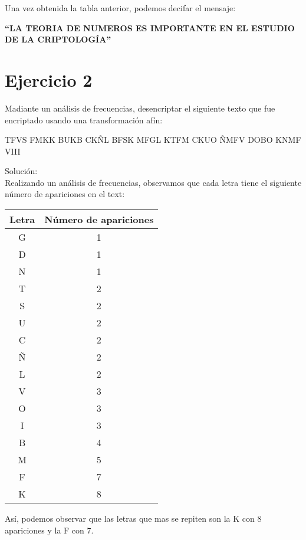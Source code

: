 \documentclass[12pt]{article}
\begin{document}
\par Una vez obtenida la tabla anterior, podemos decifar el mensaje:
\begin{center}
    \textbf{“LA TEORIA DE NUMEROS ES IMPORTANTE EN EL ESTUDIO DE LA CRIPTOLOGÍA”}
\end{center}

\section{Ejercicio 2}

\par Madiante un análisis de frecuencias, desencriptar el siguiente texto que fue encriptado usando una transformación afín:
\begin{center}
    TFVS FMKK BUKB CKÑL BFSK MFGL KTFM CKUO ÑMFV DOBO KNMF VIII
\end{center}

\par Solución: \\
Realizando un análisis de frecuencias, observamos que cada letra tiene el siguiente número de apariciones en el text: 
\begin{center}
    \begin{tabular}{|c|c|}
        \hline
            Letra & Número de apariciones \\ 
        \hline
        G & 1 \\
        D & 1 \\
        N & 1 \\
        T & 2 \\
        S & 2 \\ 
        U & 2 \\ 
        C & 2 \\
        Ñ & 2 \\ 
        L & 2 \\
        V & 3 \\
        O & 3 \\
        I & 3 \\
        B & 4 \\
        M & 5 \\
        F & 7 \\
        K & 8 \\
        \hline
    \end{tabular}
\end{center}

Así, podemos observar que las letras que mas se repiten son la K con 8 apariciones y la F con 7. 
\end{document}
